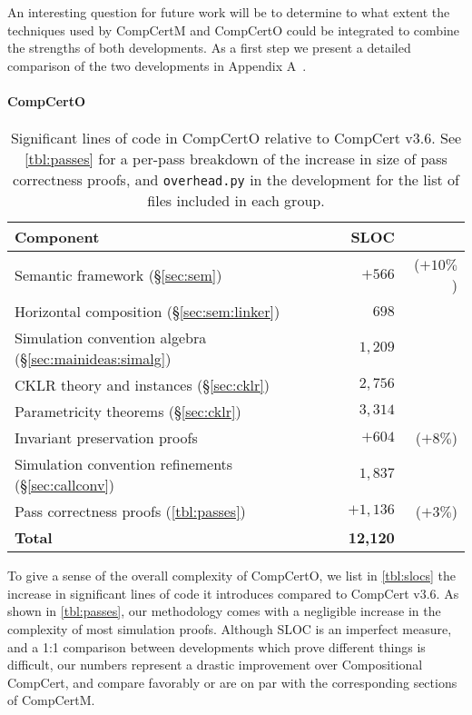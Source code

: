 \documentclass[sigplan,screen]{acmart}
\newcommand{\figsize}{\small}
\begin{document}
An interesting question for future work will be to determine
to what extent the techniques used by CompCertM and CompCertO could be
integrated to combine the strengths of both developments.  As a first
step we present a detailed comparison of the two developments
in Appendix A~\cite{compcerto21tr}.


\paragraph{CompCertO} %

\begin{table} %
  \caption{Significant lines of code in CompCertO
    relative to CompCert v$3.6$.
    See \autoref{tbl:passes}
    for a per-pass breakdown of the increase in size
    of pass correctness proofs,
    and \texttt{overhead.py} in the development
    for the list of files included in each group.}
  \label{tbl:slocs}
  \setlength\tabcolsep{3pt}
  \begin{tabular}{lrr}
    \toprule
    Component & SLOC & \\ %
    \midrule
    Semantic framework (\S\ref{sec:sem}) & $+566$ & ($+10\%$) \\
    Horizontal composition (\S\ref{sec:sem:linker}) & $698$ & \\
    Simulation convention algebra (\S\ref{sec:mainideas:simalg}) & $1{,}209$ & \\
    CKLR theory and instances (\S\ref{sec:cklr}) & $2{,}756$ & \\
    Parametricity theorems (\S\ref{sec:cklr}) & $3{,}314$ & \\
    Invariant preservation proofs & $+604$ & ($+8\%$) \\
    Simulation convention refinements (\S\ref{sec:callconv}) & $1{,}837$ \\
    Pass correctness proofs (\autoref{tbl:passes}) & $+1{,}136$ & ($+3\%$) \\
    \midrule
    \textbf{Total} & \textbf{12{,}120} & \\
    \bottomrule
  \end{tabular}
\end{table}

To give a sense of the overall complexity of CompCertO,
we list in \autoref{tbl:slocs}
the increase in significant lines of code it introduces
compared to CompCert v$3.6$.
As shown in \autoref{tbl:passes},
our methodology comes with a negligible increase
in the complexity of most simulation proofs.
Although SLOC is an imperfect measure,
and a 1:1 comparison between developments which
prove different things is difficult,
our numbers represent
a drastic improvement over Compositional CompCert,
and compare favorably
or are on par with
the corresponding sections of CompCertM.
\end{document}

